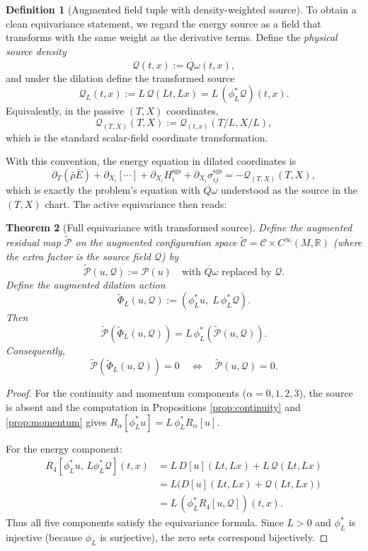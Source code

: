 \documentclass[11pt]{article}
\newtheorem{theorem}{Theorem}[section]
\theoremstyle{definition}
\newtheorem{definition}[theorem]{Definition}
\theoremstyle{remark}
\newcommand{\R}{\mathbb{R}}
\newcommand{\sgs}{\mathrm{sgs}}
\newcommand{\barrho}{\bar{\rho}}
\newcommand{\barE}{\bar{E}}
\newcommand{\Qdot}{\dot{Q\omega}}
\begin{document}
\begin{definition}[Augmented field tuple with density-weighted source]
To obtain a clean equivariance statement, we regard the energy source as a
field that transforms with the same weight as the derivative terms.  Define
the \emph{physical source density}
\[
\mathcal Q(t,x):=\Qdot(t,x),
\]
and under the dilation define the transformed source
\[
\mathcal Q_L(t,x):=L\,\mathcal Q(Lt,Lx)=L\,(\phi_L^*\mathcal Q)(t,x).
\]
Equivalently, in the passive $(T,X)$ coordinates,
\[
\mathcal Q_{(T,X)}(T,X):=\mathcal Q_{(t,x)}(T/L,X/L),
\]
which is the standard scalar-field coordinate transformation.
\end{definition}

With this convention, the energy equation in dilated coordinates is
\[
\partial_T(\barrho\barE)+\partial_{X_i}[\cdots]
+\partial_{X_i}H^{\sgs}_i+\partial_{X_i}\sigma^{\sgs}_{ij}
=-\mathcal Q_{(T,X)}(T,X),
\]
which is exactly the problem's equation with $\Qdot$ understood as the source
in the $(T,X)$ chart.  The active equivariance then reads:

\begin{theorem}[Full equivariance with transformed source]
\label{thm:full-equivariance}
Define the augmented residual map $\widetilde{\mathcal P}$ on the augmented
configuration space $\widetilde{\mathcal C}=\mathcal C\times C^\infty(M,\R)$
(where the extra factor is the source field $\mathcal Q$) by
\[
\widetilde{\mathcal P}(u,\mathcal Q):=\mathcal P(u)\quad
\text{with }\Qdot\text{ replaced by }\mathcal Q.
\]
Define the augmented dilation action
\[
\widetilde\Phi_L(u,\mathcal Q):=(\phi_L^*u,\;L\,\phi_L^*\mathcal Q).
\]
Then
\[
\widetilde{\mathcal P}(\widetilde\Phi_L(u,\mathcal Q))
=L\,\phi_L^*(\widetilde{\mathcal P}(u,\mathcal Q)).
\]
Consequently,
\[
\widetilde{\mathcal P}(\widetilde\Phi_L(u,\mathcal Q))=0
\quad\Longleftrightarrow\quad
\widetilde{\mathcal P}(u,\mathcal Q)=0.
\]
\end{theorem}

\begin{proof}
For the continuity and momentum components ($\alpha=0,1,2,3$), the source is
absent and the computation in Propositions \ref{prop:continuity} and \ref{prop:momentum} gives
$R_\alpha[\phi_L^*u]=L\,\phi_L^*R_\alpha[u]$.

For the energy component:
\[
\begin{aligned}
R_4[\phi_L^*u,\,L\phi_L^*\mathcal Q](t,x)
&=L\,D[u](Lt,Lx)+L\,\mathcal Q(Lt,Lx)\\
&=L\bigl(D[u](Lt,Lx)+\mathcal Q(Lt,Lx)\bigr)\\
&=L\,(\phi_L^*R_4[u,\mathcal Q])(t,x).
\end{aligned}
\]
Thus all five components satisfy the equivariance formula.  Since $L>0$ and
$\phi_L^*$ is injective (because $\phi_L$ is surjective), the zero sets
correspond bijectively.
\end{proof}
\end{document}
